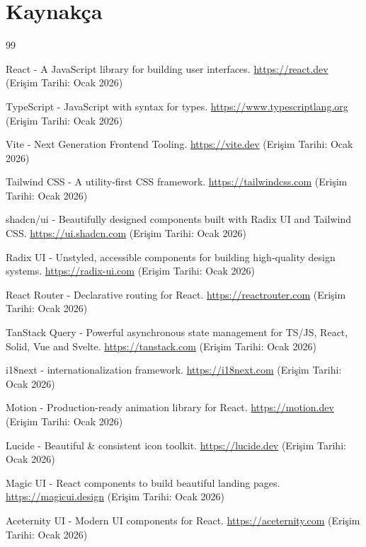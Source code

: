 \documentclass[12pt,a4paper]{article}
\begin{document}
\section{Kaynakça}

\begin{thebibliography}{99}

React - A JavaScript library for building user interfaces.
\url{https://react.dev}
(Erişim Tarihi: Ocak 2026)

TypeScript - JavaScript with syntax for types.
\url{https://www.typescriptlang.org}
(Erişim Tarihi: Ocak 2026)

Vite - Next Generation Frontend Tooling.
\url{https://vite.dev}
(Erişim Tarihi: Ocak 2026)

Tailwind CSS - A utility-first CSS framework.
\url{https://tailwindcss.com}
(Erişim Tarihi: Ocak 2026)

shadcn/ui - Beautifully designed components built with Radix UI and Tailwind CSS.
\url{https://ui.shadcn.com}
(Erişim Tarihi: Ocak 2026)

Radix UI - Unstyled, accessible components for building high‑quality design systems.
\url{https://radix-ui.com}
(Erişim Tarihi: Ocak 2026)

React Router - Declarative routing for React.
\url{https://reactrouter.com}
(Erişim Tarihi: Ocak 2026)

TanStack Query - Powerful asynchronous state management for TS/JS, React, Solid, Vue and Svelte.
\url{https://tanstack.com}
(Erişim Tarihi: Ocak 2026)

i18next - internationalization framework.
\url{https://i18next.com}
(Erişim Tarihi: Ocak 2026)

Motion - Production-ready animation library for React.
\url{https://motion.dev}
(Erişim Tarihi: Ocak 2026)

Lucide - Beautiful \& consistent icon toolkit.
\url{https://lucide.dev}
(Erişim Tarihi: Ocak 2026)

Magic UI - React components to build beautiful landing pages.
\url{https://magicui.design}
(Erişim Tarihi: Ocak 2026)

Aceternity UI - Modern UI components for React.
\url{https://aceternity.com}
(Erişim Tarihi: Ocak 2026)

\end{thebibliography}
\end{document}
